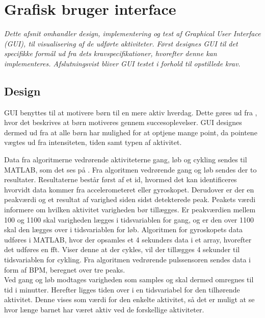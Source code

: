 \section{Grafisk bruger interface}
\textit{Dette afsnit omhandler design, implementering og test af Graphical User Interface (GUI), til visualisering af de udførte aktiviteter. Først designes GUI til det specifikke formål ud fra dets kravspecifikationer, hvorefter denne kan implementeres. Afslutningsvist bliver GUI testet i forhold til opstillede krav.}
\subsection{Design}
GUI benyttes til at motivere børn til en mere aktiv hverdag. Dette gøres ud fra , hvor det beskrives at børn motiveres gennem succesoplevelser. GUI designes dermed ud fra at alle børn har mulighed for at optjene mange point, da pointene vægtes ud fra intensiteten, tiden samt typen af aktivitet.

Data fra algoritmerne vedrørende aktiviteterne gang, løb og cykling sendes til MATLAB, som det ses på . Fra algoritmen vedrørende gang og løb sendes der to resultater. Resultaterne består først af et id, hvormed det kan identificeres hvorvidt data kommer fra accelerometeret eller gyroskopet. Derudover er der en peakværdi og et resultat af varighed siden sidst detekterede peak. Peakets værdi informere om hvilken aktivitet varigheden bør tillægges. Er peakværdien mellem 100 og 1100 skal varigheden lægges i tidsvariablen for gang, og er den over 1100 skal den lægges over i tidsvariablen for løb. Algoritmen for gyroskopets data udføres i MATLAB, hvor der opsamles et 4 sekunders data i et array, hvorefter det udføres en fft. Viser denne at der cykles, vil der tillægges 4 sekunder til tidsvariablen for cykling. Fra algoritmen vedrørende pulssensoren sendes data i form af BPM, beregnet over tre peaks. \\
Ved gang og løb modtages varigheden som samples og skal dermed omregnes til tid i minutter. Herefter ligges tiden over i en tidsvariabel for den tilhørende aktivitet. Denne vises som værdi for den enkelte aktivitet, så det er muligt at se hvor længe barnet har været aktiv ved de forskellige aktiviteter.

